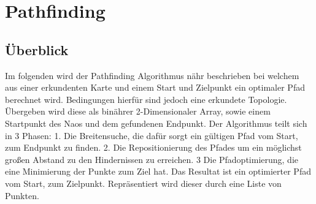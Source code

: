 \documentclass[11pt,a4paper,oneside,onecolumn]{scrartcl}
\date{\normalsize{\today}}
\begin{document}



\section*{Pathfinding}
\subsection*{Überblick}
	Im folgenden wird der Pathfinding Algorithmus nähr beschrieben bei welchem aus einer erkundenten Karte und einem Start und Zielpunkt ein optimaler Pfad berechnet wird. Bedingungen hierfür sind jedoch eine erkundete Topologie. Übergeben wird diese als binährer 2-Dimensionaler Array, sowie einem Startpunkt des Naos und dem gefundenen Endpunkt. Der Algorithmus teilt sich in 3 Phasen: 1. Die Breitensuche, die dafür sorgt ein gültigen Pfad vom Start, zum Endpunkt zu finden. 2. Die Repositionierung des Pfades um ein möglichst großen Abstand zu den Hindernissen zu erreichen. 3 Die Pfadoptimierung, die eine Minimierung der Punkte zum Ziel hat. Das Resultat ist ein optimierter Pfad vom Start, zum Zielpunkt. Repräsentiert wird dieser durch eine Liste von Punkten.
\end{document}
